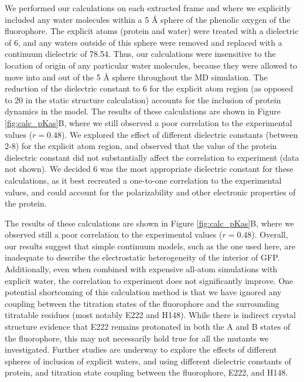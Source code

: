 We performed our \pKa{} calculations on each extracted frame and where we explicitly included any water molecules within a 5 \si{\angstrom} sphere of the phenolic oxygen of the fluorophore.
The explicit atoms (protein and water) were treated with a dielectric of 6, and any waters outside of this sphere were removed and replaced with a continuum dielectric of 78.54.
Thus, our calculations were insensitive to the location of origin of any particular water molecules, because they were allowed to move into and out of the 5 \si{\angstrom} sphere throughout the MD simulation.
The reduction of the dielectric constant to 6 for the explicit atom region (as opposed to 20 in the static structure calculation) accounts for the inclusion of protein dynamics in the model.
The results of these calculations are shown in Figure \ref{fig:calc_pKas}B, where we still observed a poor correlation to the experimental values ($r = 0.48$).
We explored the effect of different dielectric constants (between 2-8) for the explicit atom region, and observed that the value of the protein dielectric constant did not substantially affect the correlation to experiment (data not shown).
We decided 6 was the most appropriate dielectric constant for these calculations, as it best recreated a one-to-one correlation to the experimental \pKa{} values, and could account for the polarizability and other electronic properties of the protein.

The results of these calculations are shown in Figure \ref{fig:calc_pKas}B, where we observed still a poor correlation to the experimental values ($r = 0.48$).
Overall, our results suggest that simple continuum models, such as the one used here, are inadequate to describe the electrostatic heterogeneity of the interior of GFP.
Additionally, even when combined with expensive all-atom simulations with explicit water, the correlation to experiment does not significantly improve.
One potential shortcoming of this calculation method is that we have ignored any coupling between the titration states of the fluorophore and the surrounding titratable residues (most notably E222 and H148).
While there is indirect crystal structure evidence\cite{Elsliger1999} that E222 remains protonated in both the A and B states of the fluorophore, this may not necessarily hold true for all the mutants we investigated.
Further studies are underway to explore the effects of different spheres of inclusion of explicit waters,  and using different dielectric constants of protein, and titration state coupling between the fluorophore, E222, and H148.

